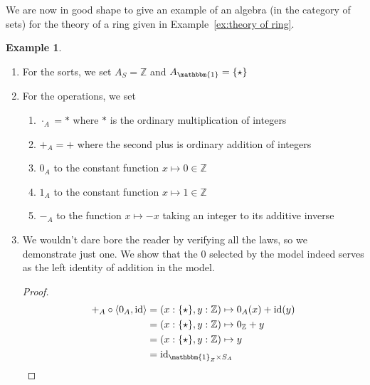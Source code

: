 \documentclass[12pt,twoside]{reedthesis}
\theoremstyle{definition}
\newtheorem{example}{Example}
\theoremstyle{remark}
\theoremstyle{plain}
\begin{document}
We are now in good shape to give an example of an algebra (in the category of
sets) for the theory of a ring given in Example~\ref{ex:theory of ring}.
\begin{example}\label{ex:integer ring}
  \begin{enumerate}
    \item For the sorts, we set $A_{S} = \mathbb{Z}$ and $A_{\mathbbm{1}} = \{\star\}$
    \item For the operations, we set
    \begin{enumerate}
      \item $\cdot_A = *$ where $*$ is the ordinary multiplication of integers
      \item $+_{A} = +$ where the second plus is ordinary addition of integers
      \item $0_{A}$ to the constant function $x \mapsto 0 \in \mathbb{Z}$
      \item $1_{A}$ to the constant function $x \mapsto 1 \in \mathbb{Z}$
      \item $-_{A}$ to the function $x \mapsto -x$ taking an integer to its additive inverse
    \end{enumerate}
    \item We wouldn't dare bore the reader by verifying all the laws, so we
          demonstrate just one. We show that the $0$ selected by the model
          indeed serves as the left identity of addition in the model.
          \begin{proof}
            \begin{align*}
              +_{A} \circ \braket{0_{A}, \id} &= (x : \{ \star \}, y : \mathbb{Z}) \mapsto 0_{A}(x) + \id(y)\\
                                          &= (x : \{ \star \}, y : \mathbb{Z}) \mapsto 0_{\mathbb{Z}} + y \\
                                          &= (x : \{ \star \}, y : \mathbb{Z}) \mapsto y\\
                                          &= \id_{\mathbbm{1}_{Z} \times S_{A}} \\
            \end{align*}


\end{proof}
\end{enumerate}
\end{example}
\end{document}
